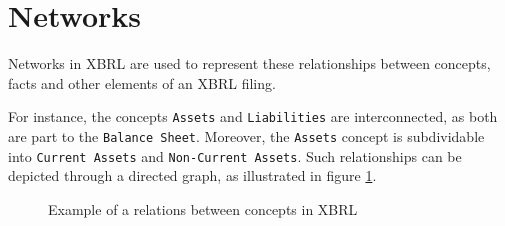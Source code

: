 \section{Networks}
\label{sec:xbrl_networks}





Networks in XBRL are used to represent these relationships between concepts, facts and other elements of an XBRL filing.

For instance, the concepts \texttt{Assets} and \texttt{Liabilities} are interconnected, as both are part to the \texttt{Balance Sheet}.
Moreover, the \texttt{Assets} concept is subdividable into \texttt{Current Assets} and \texttt{Non-Current Assets}.
Such relationships can be depicted through a directed graph, as illustrated in figure \ref{fig:example_visualization_network_xbrl}.

\begin{figure}[H]
    \caption{Example of a relations between concepts in XBRL}
    \label{fig:example_visualization_network_xbrl}
\end{figure}


